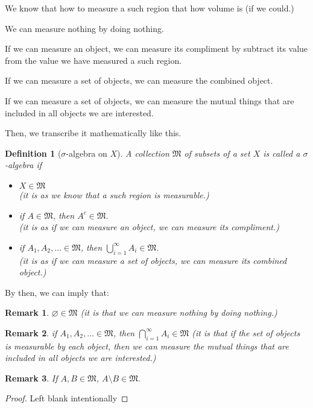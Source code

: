 \documentclass[12pt, a4paper]{report}
\newtheorem{definition}[theorem]{Definition}
\newtheorem{remark}{Remark}[theorem]
\begin{document}
    \begin{todolist}
        \item We know that how to measure a such region that how volume is (if we could.)
        \item We can measure nothing by doing nothing.
        \item If we can measure an object, we can measure its compliment by subtract its value from the value we have measured a such region.
        \item If we can measure a set of objects, we can measure the combined object.
        \item If we can measure a set of objects, we can measure the mutual things that are included in all objects we are interested.
    \end{todolist}

    Then, we transcribe it mathematically like this.

    \begin{definition}[$\sigma$-algebra on $X$]\label{sigma-algebra}
        A collection $\mathfrak{M}$ of subsets of a set $X$ is called a $\sigma$-algebra if
        \begin{itemize}
            \item $X \in \mathfrak{M}$\\
            (it is as we know that a such region is measurable.)
            \item if $A\in\mathfrak{M}$, then $A^c \in \mathfrak{M}.$\\ (it is as if we can measure an object, we can measure its compliment.)
            \item if $A_1, A_2, \dots \in \mathfrak{M}$, then $\bigcup_{i=1}^\infty A_i \in \mathfrak{M}.$\\ (it is as if we can measure a set of objects, we can measure its combined object.)
        \end{itemize}
    \end{definition}
    By then, we can imply that:
    \begin{remark} $\varnothing \in \mathfrak{M}$ (it is that we can measure nothing by doing nothing.)
    \end{remark}
    \begin{remark} if $A_1, A_2, \dots \in \mathfrak{M}$, then $\bigcap_{i=1}^\infty A_i\in \mathfrak{M}$ (it is that if the set of objects is measurable by each object, then we can measure the mutual things that are included in all objects we are interested.)
    \end{remark}
    \begin{remark}
        If $A, B \in \mathfrak{M}$, $A \setminus B \in \mathfrak{M}.$
    \end{remark}
    \begin{proof} Left blank intentionally
    \end{proof}
\end{document}
